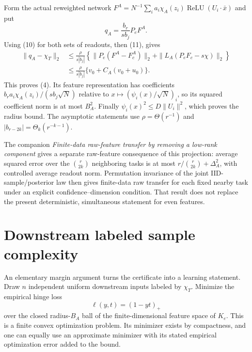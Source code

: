 \documentclass[11pt]{article}
\newcommand{\relu}{\operatorname{ReLU}}
\begin{document}
Form the actual reweighted network
$F^A=N^{-1}\sum_i a_i\chi_A(z_i)\relu(U_i\cdot\bar x)$ and put
\[
                         q_A=\frac{b_r}{s b_j}P_e F^A.
\]
Using (10) for both sets of readouts, then (11), gives
\begin{align*}
 \|q_A-\chi_T\|_2
 &\le\frac{\rho}{s|b_j|}
 \left\{\|P_e(F^A-F_c^A)\|_2+
       \|L_A(P_eF_c-s\chi)\|_2\right\}\\
 &\le\frac{\rho}{s|b_j|}\{v_0+C_A(v_0+u_0)\}.
\end{align*}
This proves (4). Its feature representation has coefficients
$b_ra_i\chi_A(z_i)/(s b_j\sqrt N)$ relative to
$x\mapsto(\psi_i(x)/\sqrt N)_i$, so its squared coefficient norm
is at most $B_A^2$. Finally $\psi_i(x)^2\le D\|U_i\|^2$,
which proves the radius bound. The asymptotic statements use
$\rho=\Theta(r^{-1})$ and
$|b_{r-2k}|=\Theta_k(r^{-k-1})$.



The companion \emph{Finite-data raw-feature transfer by removing a
low-rank component} gives a separate raw-feature consequence of this
projection: average squared error over the $\binom r{2k}$ neighboring
tasks is at most $r/\binom r{2k}+\Delta_A^2$, with controlled average
readout norm. Permutation invariance of the joint IID-sample/posterior
law then gives finite-data raw transfer for each fixed nearby task under
an explicit confidence--dimension condition. That result does not replace
the present deterministic, simultaneous statement for even features.

\section{Downstream labeled sample complexity}
An elementary margin argument turns the certificate into a learning
statement. Draw $n$ independent uniform downstream inputs labeled by
$\chi_T$. Minimize the empirical hinge loss
\[
 \ell(y,t)=(1-yt)_+
\]
over the closed radius-$B_A$ ball of the finite-dimensional feature
space of $K_e$. This is a finite convex optimization problem. Its minimizer
exists by compactness, and one can equally use an approximate minimizer
with its stated empirical optimization error added to the bound.
\end{document}

